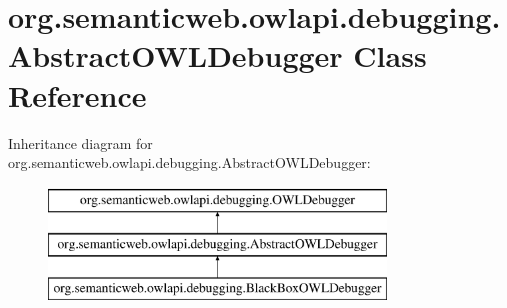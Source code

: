 \hypertarget{classorg_1_1semanticweb_1_1owlapi_1_1debugging_1_1_abstract_o_w_l_debugger}{\section{org.\-semanticweb.\-owlapi.\-debugging.\-Abstract\-O\-W\-L\-Debugger Class Reference}
\label{classorg_1_1semanticweb_1_1owlapi_1_1debugging_1_1_abstract_o_w_l_debugger}
}
Inheritance diagram for org.\-semanticweb.\-owlapi.\-debugging.\-Abstract\-O\-W\-L\-Debugger\-:\begin{figure}[H]
\begin{center}
\leavevmode
\includegraphics[height=3.000000cm]{classorg_1_1semanticweb_1_1owlapi_1_1debugging_1_1_abstract_o_w_l_debugger}
\end{center}
\end{figure}
